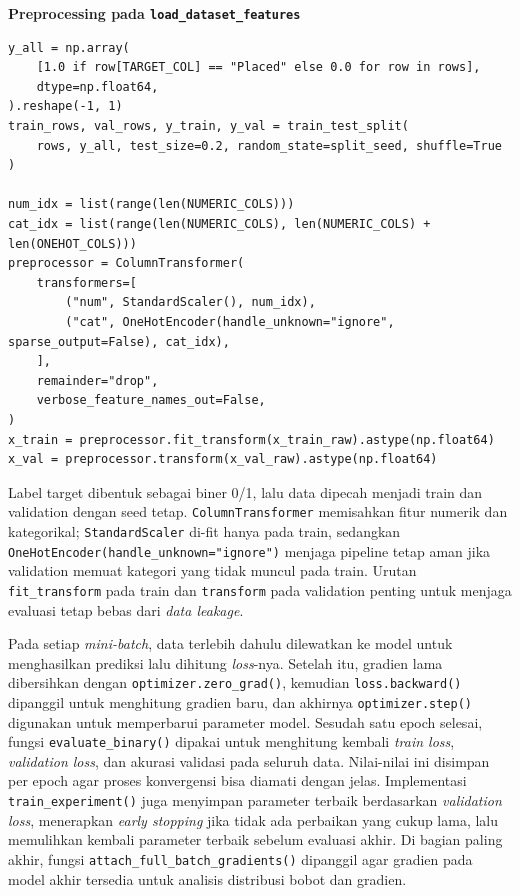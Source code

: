 \documentclass{article}
\begin{document}
\noindent\textbf{Preprocessing pada \texttt{load\_dataset\_features}}\par
\begin{lstlisting}
y_all = np.array(
    [1.0 if row[TARGET_COL] == "Placed" else 0.0 for row in rows],
    dtype=np.float64,
).reshape(-1, 1)
train_rows, val_rows, y_train, y_val = train_test_split(
    rows, y_all, test_size=0.2, random_state=split_seed, shuffle=True
)

num_idx = list(range(len(NUMERIC_COLS)))
cat_idx = list(range(len(NUMERIC_COLS), len(NUMERIC_COLS) + len(ONEHOT_COLS)))
preprocessor = ColumnTransformer(
    transformers=[
        ("num", StandardScaler(), num_idx),
        ("cat", OneHotEncoder(handle_unknown="ignore", sparse_output=False), cat_idx),
    ],
    remainder="drop",
    verbose_feature_names_out=False,
)
x_train = preprocessor.fit_transform(x_train_raw).astype(np.float64)
x_val = preprocessor.transform(x_val_raw).astype(np.float64)
\end{lstlisting}
Label target dibentuk sebagai biner 0/1, lalu data dipecah menjadi train dan validation dengan seed tetap. \texttt{ColumnTransformer} memisahkan fitur numerik dan kategorikal; \texttt{StandardScaler} di-fit hanya pada train, sedangkan \texttt{OneHotEncoder(handle\_unknown="ignore")} menjaga pipeline tetap aman jika validation memuat kategori yang tidak muncul pada train. Urutan \texttt{fit\_transform} pada train dan \texttt{transform} pada validation penting untuk menjaga evaluasi tetap bebas dari \textit{data leakage}.

Pada setiap \textit{mini-batch}, data terlebih dahulu dilewatkan ke model untuk menghasilkan prediksi lalu dihitung \textit{loss}-nya. Setelah itu, gradien lama dibersihkan dengan \texttt{optimizer.zero\_grad()}, kemudian \texttt{loss.backward()} dipanggil untuk menghitung gradien baru, dan akhirnya \texttt{optimizer.step()} digunakan untuk memperbarui parameter model. Sesudah satu epoch selesai, fungsi \texttt{evaluate\_binary()} dipakai untuk menghitung kembali \textit{train loss}, \textit{validation loss}, dan akurasi validasi pada seluruh data. Nilai-nilai ini disimpan per epoch agar proses konvergensi bisa diamati dengan jelas. Implementasi \texttt{train\_experiment()} juga menyimpan parameter terbaik berdasarkan \textit{validation loss}, menerapkan \textit{early stopping} jika tidak ada perbaikan yang cukup lama, lalu memulihkan kembali parameter terbaik sebelum evaluasi akhir. Di bagian paling akhir, fungsi \texttt{attach\_full\_batch\_gradients()} dipanggil agar gradien pada model akhir tersedia untuk analisis distribusi bobot dan gradien.
\end{document}

